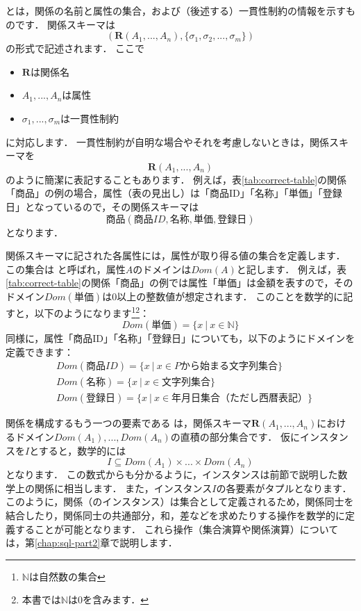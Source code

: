  とは，関係の名前と属性の集合，および（後述する）一貫性制約の情報を示すものです．
関係スキーマは
\begin{equation}
(\boldsymbol{R}(A_1, ..., A_n), \{\sigma_1, \sigma_2, ..., \sigma_m\})
\end{equation}
の形式で記述されます．
ここで
\begin{itemize}
\item $\boldsymbol{R}$は関係名
\item $A_1, ..., A_n$は属性
\item $\sigma_1, ..., \sigma_m$は一貫性制約
\end{itemize}
に対応します．
一貫性制約が自明な場合やそれを考慮しないときは，関係スキーマを
\begin{equation}
\boldsymbol{R}(A_1, ..., A_n)
\end{equation}
のように簡潔に表記することもあります．
例えば，表\ref{tab:correct-table}の関係「商品」の例の場合，属性（表の見出し）は「商品ID」「名称」「単価」「登録日」となっているので，その関係スキーマは
\begin{equation}
\textbf{商品}(商品ID, 名称, 単価, 登録日)
\end{equation}
となります．

関係スキーマに記された各属性には，属性が取り得る値の集合を定義します．
この集合は と呼ばれ，属性$A$のドメインは$Dom(A)$と記します．
例えば，表\ref{tab:correct-table}の関係「商品」の例では属性「単価」は金額を表すので，そのドメイン$Dom(単価)$は0以上の整数値が想定されます．
このことを数学的に記すと，以下のようになります\footnote{$\mathbb{N}$は自然数の集合}\footnote{本書では$\mathbb{N}$は0を含みます．}：
\begin{equation}
Dom(単価) = \{ x \ | \ x \in \mathbb{N} \}
\end{equation}
同様に，属性「商品ID」「名称」「登録日」についても，以下のようにドメインを定義できます：
\begin{align}
&Dom(商品ID) = \{ x \ | \ x \in Pから始まる文字列集合 \} \\
&Dom(名称) = \{ x \ | \ x \in 文字列集合 \} \\
&Dom(登録日) = \{ x \ | \ x \in 年月日集合（ただし西暦表記） \}
\end{align}

関係を構成するもう一つの要素である は，関係スキーマ$\boldsymbol{R}(A_1, ..., A_n)$におけるドメイン$Dom(A_1), ..., Dom(A_n)$の直積の部分集合です．
仮にインスタンスを$I$とすると，数学的には
\begin{equation}
I \subseteq Dom(A_1) \times ... \times Dom(A_n)
\end{equation}
となります．
この数式からも分かるように，インスタンスは前節で説明した数学上の関係に相当します．
また，インスタンス$I$の各要素がタプルとなります．
このように，関係（のインスタンス）は集合として定義されるため，関係同士を結合したり，関係同士の共通部分，和，差などを求めたりする操作を数学的に定義することが可能となります．
これら操作（集合演算や関係演算）については，第\ref{chap:sql-part2}章で説明します．

